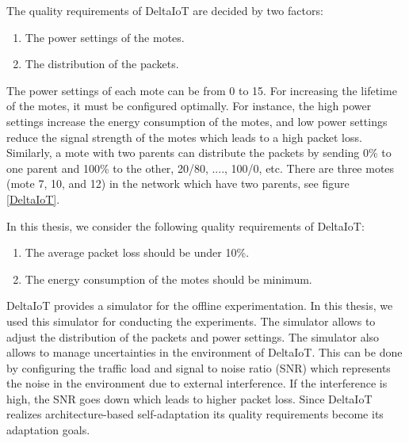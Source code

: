 \documentclass[a4paper,12pt]{article}
\begin{document}
The quality requirements of DeltaIoT are decided by two factors:
\begin{enumerate}
	\item The power settings of the motes.
	\item The distribution of the packets.
\end{enumerate}
The power settings of each mote can be from 0 to 15. For increasing the lifetime of the motes, it must be configured optimally. For instance, the high power settings increase the energy consumption of the motes, and low power settings reduce the signal strength of the motes which leads to a high packet loss. Similarly, a mote with two parents can distribute the packets by sending 0\% to one parent and 100\% to the other, 20/80, ...., 100/0, etc. There are three motes (mote 7, 10, and 12) in the network which have two parents, see figure \ref{DeltaIoT}. 

In this thesis, we consider the following quality requirements of DeltaIoT:
\begin{enumerate}
	\item The average packet loss should be under 10\%.
	\item The energy consumption of the motes should be minimum. 
\end{enumerate}
DeltaIoT provides a simulator for the offline experimentation. In this thesis, we used this simulator for conducting the experiments. The simulator allows to adjust the distribution of the packets and power settings. The simulator also allows to manage uncertainties in the environment of DeltaIoT. This can be done by configuring the traffic load and signal to noise ratio (SNR) which represents the noise in the environment due to external interference. If the interference is high, the SNR goes down which leads to higher packet loss. Since DeltaIoT realizes architecture-based self-adaptation its quality requirements become its adaptation goals.
\end{document}
